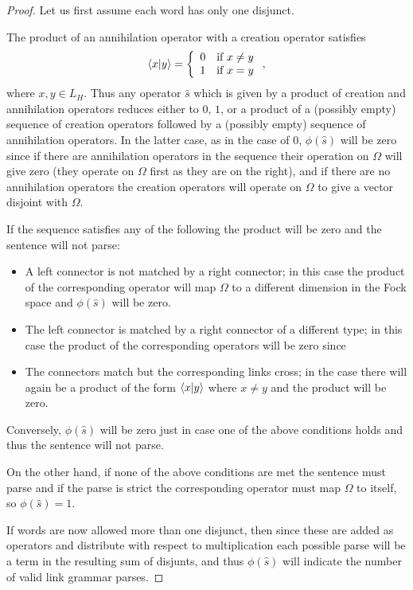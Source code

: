 \documentclass[12pt]{report}
\begin{document}
\begin{proof}
Let us first assume each word has only one disjunct.

The product of an annihilation operator with a creation operator satisfies
$$\langle x| y\rangle = \left\{\begin{array}{ll}
0 & \textrm{if $x \neq y$}\\
1 & \textrm{if $x = y$}\end{array}\right.,$$
where $x, y \in L_H$. Thus any operator $\hat{s}$ which is given by a product of creation and annihilation operators reduces either to $0$, $1$, or a product of a (possibly empty) sequence of creation operators followed by a (possibly empty) sequence of annihilation operators. In the latter case, as in the case of $0$, $\phi(\hat{s})$ will be zero since if there are annihilation operators in the sequence their operation on $\Omega$ will give zero (they operate on $\Omega$ first as they are on the right), and if there are no annihilation operators the creation operators will operate on $\Omega$ to give a vector disjoint with $\Omega$.

If the sequence satisfies any of the following the product will be zero and the sentence will not parse:
\begin{itemize}
\item A left connector is not matched by a right connector; in this case the product of the corresponding operator will map $\Omega$ to a different dimension in the Fock space and $\phi(\hat{s})$ will be zero.
\item The left connector is matched by a right connector of a different type; in this case the product of the corresponding operators will be zero since
\item The connectors match but the corresponding links cross; in the case there will again be a product of the form $\langle x| y\rangle$ where $x\neq y$ and the product will be zero.
\end{itemize}
Conversely, $\phi(\hat{s})$ will be zero just in case one of the above conditions holds and thus the sentence will not parse.

On the other hand, if none of the above conditions are met the sentence must parse and if the parse is strict the corresponding operator must map $\Omega$ to itself, so $\phi(\hat{s}) = 1$.

If words are now allowed more than one disjunct, then since these are added as operators and distribute with respect to multiplication each possible parse will be a term in the resulting sum of disjunts, and thus $\phi(\hat{s})$ will indicate the number of valid link grammar parses.
\end{proof}
\end{document}
